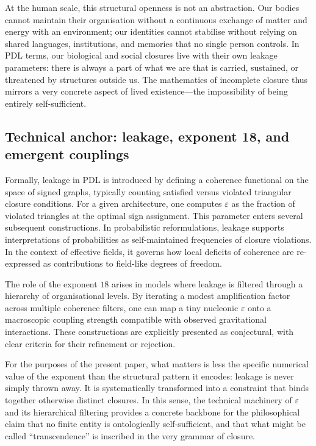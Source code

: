 \documentclass[11pt,a4paper]{article}
\theoremstyle{definition}
\begin{document}
At the human scale, this structural openness is not an abstraction. Our bodies cannot maintain their organisation without a continuous exchange of matter and energy with an environment; our identities cannot stabilise without relying on shared languages, institutions, and memories that no single person controls. In PDL terms, our biological and social closures live with their own leakage parameters: there is always a part of what we are that is carried, sustained, or threatened by structures outside us. The mathematics of incomplete closure thus mirrors a very concrete aspect of lived existence—the impossibility of being entirely self-sufficient.

\subsection{Technical anchor: leakage, exponent 18, and emergent couplings}

Formally, leakage in PDL is introduced by defining a coherence functional on the space of signed graphs, typically counting satisfied versus violated triangular closure conditions.\cite{Laubscher_Leakage_Probability_2024} For a given architecture, one computes \(\varepsilon\) as the fraction of violated triangles at the optimal sign assignment. This parameter enters several subsequent constructions. In probabilistic reformulations, leakage supports interpretations of probabilities as self-maintained frequencies of closure violations.\cite{Laubscher_Leakage_Probability_2024} In the context of effective fields, it governs how local deficits of coherence are re-expressed as contributions to field-like degrees of freedom.\cite{Laubscher_EffectiveFields_2024}

The role of the exponent \(18\) arises in models where leakage is filtered through a hierarchy of organisational levels.\cite{Laubscher_Exponent18_v2_2024} By iterating a modest amplification factor across multiple coherence filters, one can map a tiny nucleonic \(\varepsilon\) onto a macroscopic coupling strength compatible with observed gravitational interactions.\cite{Laubscher_UniversalCoherenceLeakage_2024} These constructions are explicitly presented as conjectural, with clear criteria for their refinement or rejection.\cite{Laubscher_PDL_Position_2024,Laubscher_PDL_GlobalMapping_v6_2024}

For the purposes of the present paper, what matters is less the specific numerical value of the exponent than the structural pattern it encodes: leakage is never simply thrown away. It is systematically transformed into a constraint that binds together otherwise distinct closures. In this sense, the technical machinery of \(\varepsilon\) and its hierarchical filtering provides a concrete backbone for the philosophical claim that no finite entity is ontologically self-sufficient, and that what might be called ``transcendence'' is inscribed in the very grammar of closure.
\end{document}
